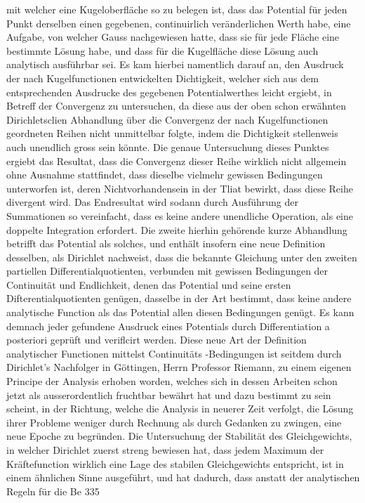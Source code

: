 \documentclass[11pt]{article}
\begin{document}
\noindent mit welcher eine Kugeloberfläche so zu belegen ist, dass das Potential für jeden Punkt derselben einen gegebenen, continuirlich veränderlichen Werth habe, eine Aufgabe, von welcher Gauss nachgewiesen hatte, dass sie für jede Fläche eine bestimmte Lösung habe, und dass für die Kugelfläche diese Lösung auch analytisch ausführbar sei. Es kam hierbei namentlich darauf an, den Ausdruck der nach Kugelfunctionen entwickelten Dichtigkeit, welcher sich aus dem entsprechenden Ausdrucke des gegebenen Potentialwerthes leicht ergiebt, in Betreff der Convergenz zu untersuchen, da diese aus der oben schon erwähnten Dirichletsclien Abhandlung über die Convergenz der nach Kugelfunctionen geordneten Reihen nicht unmittelbar folgte, indem die Dichtigkeit stellenweis auch unendlich gross sein könnte. Die genaue Untersuchung dieses Punktes ergiebt das Resultat, dass die Convergenz dieser Reihe wirklich nicht allgemein ohne Ausnahme stattfindet, dass dieselbe vielmehr gewissen Bedingungen unterworfen ist, deren Nichtvorhandensein in der Tliat bewirkt, dass diese Reihe divergent wird. Das Endresultat wird sodann durch Ausführung der Summationen so vereinfacht, dass es keine andere unendliche Operation, als eine doppelte Integration erfordert. Die zweite hierhin gehörende kurze Abhandlung betrifft das Potential als solches, und enthält insofern eine neue Definition desselben, als Dirichlet nachweist, dass die bekannte Gleichung unter den zweiten partiellen Differentialquotienten, verbunden mit gewissen Bedingungen der Continuität und Endlichkeit, denen das Potential und seine ersten Difterentialquotienten genügen, dasselbe in der Art bestimmt, dass keine andere analytische Function als das Potential allen diesen Bedingungen genügt. Es kann demnach jeder gefundene Ausdruck eines Potentials durch Differentiation a posteriori geprüft und veriflcirt werden. Diese neue Art der Definition analytischer Functionen mittelst Continuitäts -Bedingungen ist seitdem durch Dirichlet’s Nachfolger in Göttingen, Herrn Professor Riemann, zu einem eigenen Principe der Analysis erhoben worden, welches sich in dessen Arbeiten schon jetzt als ausserordentlich fruchtbar bewährt hat und dazu bestimmt zu sein scheint, in der Richtung, welche die Analysis in neuerer Zeit verfolgt, die Lösung ihrer Probleme weniger durch Rechnung als durch Gedanken zu zwingen, eine neue Epoche zu begründen. Die Untersuchung der Stabilität des Gleichgewichts, in welcher Dirichlet zuerst streng bewiesen hat, dass jedem Maximum der Kräftefunction wirklich eine Lage des stabilen Gleichgewichts entspricht, ist in einem ähnlichen Sinne ausgeführt, und hat dadurch, dass anstatt der analytischen Regeln für die Be 335
\par
\end{document}
